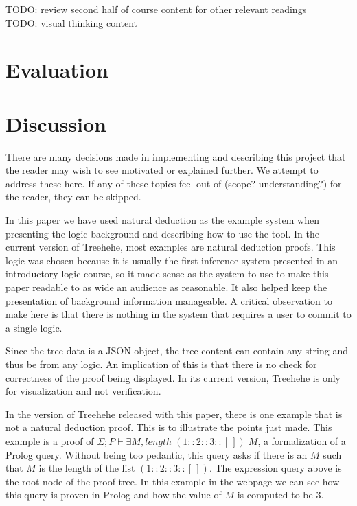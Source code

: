 \documentclass[conference]{IEEEtran}
\newcommand{\projectname}{Treehehe}
\begin{document}
TODO: review second half of course content for other relevant readings \\

TODO: visual thinking content \\

\section{Evaluation}
\label{sec:evaluation}



\section{Discussion}
\label{sec:discussion}

There are many decisions made in implementing and describing this project that the reader may wish to see motivated or explained further. We attempt to address these here. If any of these topics feel out of (scope? understanding?) for the reader, they can be skipped.

In this paper we have used natural deduction as the example system when presenting the logic background and describing how to use the tool. In the current version of \projectname{}, most examples are natural deduction proofs. This logic was chosen because it is usually the first inference system presented in an introductory logic course, so it made sense as the system to use to make this paper readable to as wide an audience as reasonable. It also helped keep the presentation of background information manageable. A critical observation to make here is that there is nothing in the system that requires a user to commit to a single logic.

Since the tree data is a JSON object, the tree content can contain any string and thus be from any logic. An implication of this is that there is no check for correctness of the proof being displayed. In its current version, \projectname{} is only for visualization and not verification.

In the version of \projectname{} released with this paper, there is one example that is not a natural deduction proof. This is to illustrate the points just made. This example is a proof of $\Sigma ; P \vdash \exists M, \mathit{length} \; (1 :: 2 :: 3 :: [ \, ]) \; M$, a formalization of a Prolog query. Without being too pedantic, this query asks if there is an $M$ such that $M$ is the length of the list $(1 :: 2 :: 3 :: [\, ])$. The expression query above is the root node of the proof tree. In this example in the webpage we can see how this query is proven in Prolog and how the value of $M$ is computed to be 3.
\end{document}
